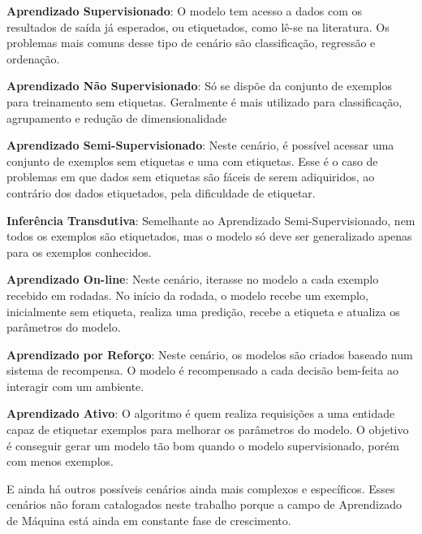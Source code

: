 \begin{description}
\item \textbf{Aprendizado Supervisionado}: O modelo tem acesso a dados com os resultados de saída já esperados, ou etiquetados, como lê-se na literatura. Os problemas mais comuns desse tipo de cenário são classificação, regressão e ordenação.

\item \textbf{Aprendizado Não Supervisionado}: Só se dispõe da conjunto de exemplos para treinamento sem etiquetas. Geralmente é mais utilizado para classificação, agrupamento e redução de dimensionalidade

\item \textbf{Aprendizado Semi-Supervisionado}: Neste cenário, é possível acessar uma conjunto de exemplos sem etiquetas e uma com etiquetas. Esse é o caso de problemas em que dados sem etiquetas são fáceis de serem adiquiridos, ao contrário dos dados etiquetados, pela dificuldade de etiquetar.

\item \textbf{Inferência Transdutiva}: Semelhante ao Aprendizado Semi-Supervisionado, nem todos os exemplos são etiquetados, mas o modelo só deve ser generalizado apenas para os exemplos conhecidos.

\item \textbf{Aprendizado On-line}: Neste cenário, iterasse no modelo a cada exemplo recebido em rodadas. No início da rodada, o modelo recebe um exemplo, inicialmente sem etiqueta, realiza uma predição, recebe a etiqueta e atualiza os parâmetros do modelo.

\item \textbf{Aprendizado por Reforço}: Neste cenário, os modelos são criados baseado num sistema de recompensa. O modelo é recompensado a cada decisão bem-feita ao interagir com um ambiente.

\item \textbf{Aprendizado Ativo}: O algoritmo é quem realiza requisições a uma entidade capaz de etiquetar exemplos para melhorar os parâmetros do modelo. O objetivo é conseguir gerar um modelo tão bom quando o modelo supervisionado, porém com menos exemplos.

\end{description}

E ainda há outros possíveis cenários ainda mais complexos e específicos. Esses cenários não foram catalogados neste trabalho porque a campo de Aprendizado de Máquina está ainda em constante fase de crescimento.














